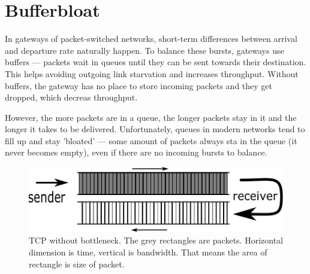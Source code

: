 




\section{Bufferbloat}
\label{chap:bb}

In gateways of packet-switched networks, short-term differences between arrival and departure rate naturally happen. To balance these bursts, gateways use buffers --- packets  wait in queues  until they can be sent towards their destination. This helps avoiding outgoing link starvation  and  increases throughput. Without buffers, the gateway has no place to store incoming packets and they get dropped, which decreas throughput.


However, the more packets are in a queue, the longer packets stay in it and the longer it takes  to be delivered. Unfortunately, queues in modern networks tend to fill up and stay 'bloated' \cite{Gettys:2012:BDB:2063176.2063196} --- some amount of packets always sta in the queue (it never becomes empty), even if there are no incoming bursts to balance. 

\begin{figure}
	\centering
	\includegraphics[width=137mm]{drawings/tcp_no_bottleneck}
	\caption{TCP without bottleneck. The grey rectangles are packets. Horizontal dimension is time, vertical is bandwidth. That means the area of rectangle is size of packet.}
	\label{fig01:no_bottle}
\end{figure}

